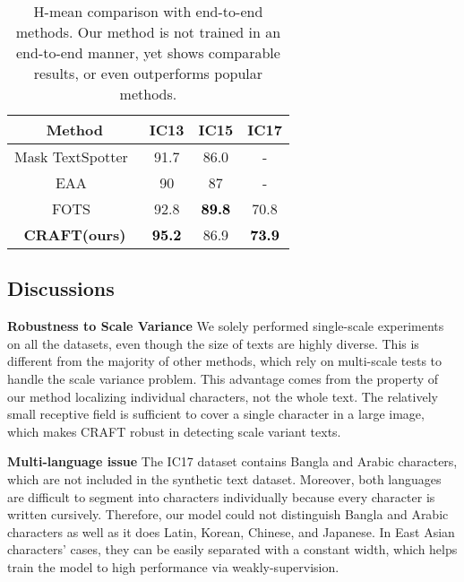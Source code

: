 \documentclass[10pt,twocolumn,letterpaper]{article}
\begin{document}
\begin{table}[t!]
  \centering
\tabcolsep=0.15cm
\renewcommand*{\arraystretch}{1.1}
  \begin{tabular}{c||c|c|c}
    \hline 
    \rule{0pt}{10pt} {\textbf{Method}} & {\textbf{IC13}} & {\textbf{IC15}} & {\textbf{IC17}}\\
\hline
    \hline
    \rule{0pt}{10pt}
    Mask TextSpotter~\cite{lyu2018mask} & 91.7 & 86.0 & - \\ 
    EAA~\cite{he2018end} & 90 & 87 & - \\ 
    FOTS~\cite{liu2018fots} & 92.8 & \textcolor{black}{\textbf{89.8}} &  70.8 \\ 
    \hline
    \hline
    \rule{0pt}{10pt} \textbf{CRAFT(ours)} & \textcolor{black}{\textbf{95.2}} & {86.9} & \textcolor{black}{\textbf{73.9}} \\
    \hline
  \end{tabular}
  \vspace{3mm}
  \caption{H-mean comparison with end-to-end methods. Our method is not trained in an end-to-end manner, yet shows comparable results, or even outperforms popular methods.} 
  \label{tab:result_endtoend}
\end{table}



\subsection{Discussions}

\noindent\textbf{Robustness to Scale Variance} We solely performed single-scale experiments on all the datasets, even though the size of texts are highly diverse. This is different from the majority of other methods, which rely on multi-scale tests to handle the scale variance problem. This advantage comes from the property of our method localizing individual characters, not the whole text. The relatively small receptive field is sufficient to cover a single character in a large image, which makes CRAFT robust in detecting scale variant texts.

\noindent\textbf{Multi-language issue} The IC17 dataset contains Bangla and Arabic characters, which are not included in the synthetic text dataset. Moreover, both languages are difficult to segment into characters individually because every character is written cursively. Therefore, our model could not distinguish Bangla and Arabic characters as well as it does Latin, Korean, Chinese, and Japanese.
In East Asian characters' cases, they can be easily separated with a constant width, which helps train the model to high performance via weakly-supervision.
\end{document}
